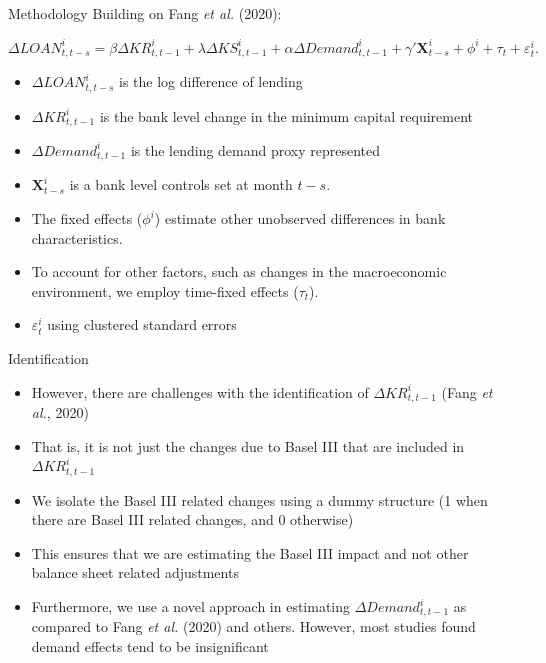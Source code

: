 \documentclass[
  14,
  ignorenonframetext,
  aspectratio=141,
]{beamer}
\providecommand{\tightlist}{%
  \setlength{\itemsep}{0pt}\setlength{\parskip}{0pt}}
\begin{document}
\begin{frame}{Methodology}
\protect\hypertarget{methodology}{}
Building on Fang \emph{et al.} (2020):

\(\Delta LOAN^i_{t, t-s} = \beta \Delta KR^i_{t, t-1} + \lambda \Delta KS^i_{t, t-1} + \alpha \Delta Demand^i_{t, t-1} + \gamma' \pmb{X}^i_{t-s} + \phi^i + \tau_t + \varepsilon^i_t.\)

\begin{itemize}
\tightlist
\item
  \(\Delta LOAN^i_{t, t-s}\) is the log difference of lending
\item
  \(\Delta KR^i_{t, t-1}\) is the bank level change in the minimum
  capital requirement
\item
  \(\Delta Demand^i_{t, t-1}\) is the lending demand proxy represented
\item
  \(\pmb{X}^i_{t-s}\) is a bank level controls set at month \(t-s\).
\item
  The fixed effects (\(\phi^i\)) estimate other unobserved differences
  in bank characteristics.
\item
  To account for other factors, such as changes in the macroeconomic
  environment, we employ time-fixed effects (\(\tau_t\)).
\item
  \(\varepsilon^i_t\) using clustered standard errors
\end{itemize}
\end{frame}

\begin{frame}{Identification}
\protect\hypertarget{identification}{}
\begin{itemize}
\tightlist
\item
  However, there are challenges with the identification of
  \(\Delta KR^i_{t, t-1}\) (Fang \emph{et al.}, 2020)
\item
  That is, it is not just the changes due to Basel III that are included
  in \(\Delta KR^i_{t, t-1}\)
\item
  We isolate the Basel III related changes using a dummy structure (1
  when there are Basel III related changes, and 0 otherwise)
\item
  This ensures that we are estimating the Basel III impact and not other
  balance sheet related adjustments
\item
  Furthermore, we use a novel approach in estimating
  \(\Delta Demand^i_{t, t-1}\) as compared to Fang \emph{et al.} (2020)
  and others. However, most studies found demand effects tend to be
  insignificant
\end{itemize}
\end{frame}
\end{document}
